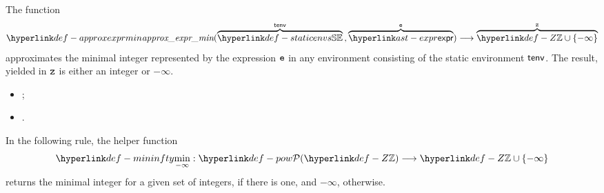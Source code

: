 \begin{mathpar}
\end{mathpar}

\begin{mathpar}
\end{mathpar}

\hypertarget{def-approxexprmin}{}
The function
\[
\approxexprmin(\overname{\staticenvs}{\tenv} \aslsep \overname{\expr}{\ve}) \aslto
  \overname{\Z \cup \{-\infty\}}{\vz}
\]
approximates the minimal integer represented by the expression $\ve$
in any environment consisting of the static environment
$\tenv$. The result, yielded in $\vz$ is either an integer or $-\infty$.

\ProseParagraph
\AllApply
\begin{itemize}
  \item \Proseapproxexpr{$\tenv$}{$\Over$}{$\ve$}{$\vs$};
  \item {}.
\end{itemize}

\FormallyParagraph
\hypertarget{def-mininfty}{}
In the following rule, the helper function
\[
\mininfty : \pow{\Z} \aslto \Z \cup \{-\infty\}
\]
returns the minimal integer
for a given set of integers, if there is one, and $-\infty$, otherwise.

